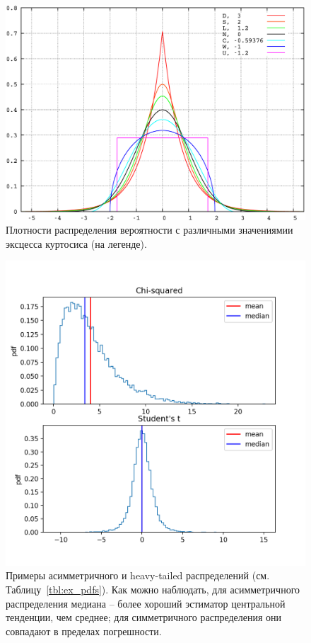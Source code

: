 \documentclass{report}
\begin{document}
\begin{figure}[h]
	\includegraphics[width=\linewidth]{different_kurtosis_pdfs}
	\caption{Плотности распределения вероятности с различными значениямии эксцесса куртосиса (на легенде).\label{fig:excess_kurtosis_pdfs}}
\end{figure}

\begin{figure}[h]
	\includegraphics[width=\linewidth]{chi-sq_and_t_pdfs}
	\caption{Примеры асимметричного и heavy-tailed распределений (см. Таблицу~\ref{tbl:ex_pdfs}). Как можно наблюдать, для асимметричного распределения медиана -- более хороший эстиматор центральной тенденции, чем среднее; для симметричного распределения они совпадают в пределах погрешности.\label{fig:ex_pdfs}}
\end{figure}
\end{document}
